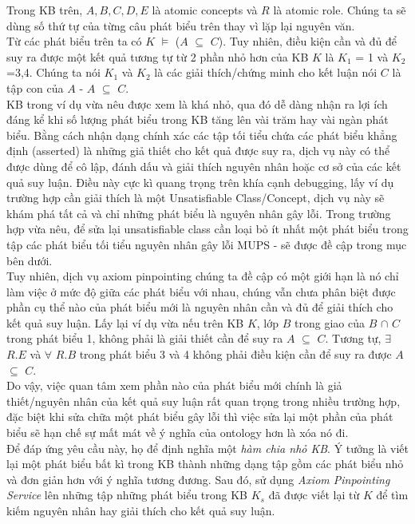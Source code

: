 Trong KB trên, $A, B, C, D, E$ là atomic concepts và $R$ là atomic role.  Chúng ta sẽ dùng số thứ tự của từng câu phát biểu trên thay vì lặp lại nguyên văn.
\\
\hspace*{0.05\textwidth} Từ các phát biểu trên ta có $K$ $\models$ ($A$ $\subseteq$ $C$). Tuy nhiên, điều kiện cần và đủ để suy ra được một kết quả tương tự từ 2 phần nhỏ hơn của KB $K$ là $K_{1}$ = {1} và $K_{2}$ ={3,4}. Chúng ta nói $K_{1}$ và $K_{2}$ là các giải thích/chứng minh cho kết luận nói $C$ là tập con của $A$ - $A$ $\subseteq$ $C$.
\\
\hspace*{0.05\textwidth} KB trong ví dụ vừa nêu được xem là khá nhỏ, qua đó dễ dàng nhận ra lợi ích đáng kể khi số lượng phát biểu trong KB tăng lên vài trăm hay vài ngàn phát biểu. Bằng cách nhận dạng chính xác các tập tối tiểu chứa các phát biểu khẳng định (asserted) là những giả thiết cho kết quả được suy ra, dịch vụ này có thể được dùng để cô lập, đánh dấu và giải thích nguyên nhân hoặc cơ sở của các kết quả suy luận. Điều này cực kì quang trọng trên khía cạnh debugging, lấy ví dụ trường hợp cần giải thích là một Unsatisfiable Class/Concept, dịch vụ này sẽ khám phá tất cả và chỉ những phát biểu là nguyên nhân gây lỗi. Trong trường hợp vừa nêu, để sửa lại unsatisfiable class cần loại bỏ ít nhất một phát biểu trong tập các phát biểu tối tiểu nguyên nhân gây lỗi MUPS - sẽ được đề cập trong mục bên dưới.
\\
\hspace*{0.05\textwidth} Tuy nhiên, dịch vụ axiom pinpointing chúng ta đề cập có một giới hạn là nó chỉ làm việc ở mức độ giữa các phát biểu với nhau, chúng vẫn chưa phân biệt được phần cụ thể nào của phát biểu mới là nguyên nhân cần và đủ để giải thích cho kết quả suy luận. Lấy lại ví dụ vừa nếu trên KB $K$, lớp $B$ trong giao của $B$ $\cap$ $C$ trong phát biểu 1, không phải là giải thiết cần để suy ra $A$ $\subseteq$ $C$. Tương tự, $\exists$ $R.E$ và $\forall$ $R.B$ trong phát biểu 3 và 4 không phải điều kiện cần để suy ra được $A$ $\subseteq$ $C$. 
\\
\hspace{0.05\textwidth} Do vậy, việc quan tâm xem phần nào của phát biểu mới chính là giả thiết/nguyên nhân của kết quả suy luận rất quan trọng trong nhiều trường hợp, đặc biệt khi sửa chữa một phát biểu gây lỗi thì việc sửa lại một phần của phát biểu sẽ hạn chế sự mất mát về ý nghĩa của ontology hơn là xóa nó đi.
\\
\hspace*{0.05\textwidth} Để đáp ứng yêu cầu này, họ để định nghĩa một \textit{hàm chia nhỏ KB}. Ý tưởng là viết lại một phát biểu bất kì trong KB thành những dạng tập gồm các phát biểu nhỏ và đơn giản hơn với ý nghĩa  tương đương. Sau đó, sử dụng \textit{Axiom Pinpointing Service} lên những tập những phát biểu trong KB $K_{s}$ đã được viết lại từ $K$ để tìm kiếm nguyên nhân hay giải thích cho kết quả suy luận.
